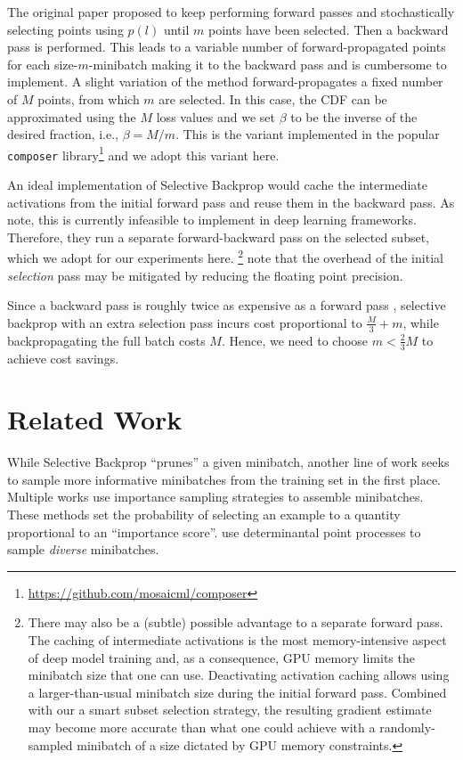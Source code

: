 \documentclass{article}
\theoremstyle{plain}
\theoremstyle{definition}
\theoremstyle{remark}
\begin{document}
The original paper proposed to keep performing forward passes and stochastically selecting points using $p(l)$ until $m$ points have been selected.
Then a backward pass is performed.
This leads to a variable number of forward-propagated points for each size-$m$-minibatch making it to the backward pass and is cumbersome to implement.
A slight variation of the method forward-propagates a fixed number of $M$ points, from which $m$ are selected.
In this case, the CDF can be approximated using the $M$ loss values and we set $\beta$ to be the inverse of the desired fraction, i.e., $\beta = M/m$.
This is the variant implemented in the popular \texttt{composer} library\footnote{\url{https://github.com/mosaicml/composer}} and we adopt this variant here.


An ideal implementation of Selective Backprop would cache the intermediate activations from the initial forward pass and reuse them in the backward pass.
As \citet{jiang2019accelerating} note, this is currently infeasible to implement in deep learning frameworks.
Therefore, they run a separate forward-backward pass on the selected subset, which we adopt for our experiments here.
\footnote{There may also be a (subtle) possible advantage to a separate forward pass.
The caching of intermediate activations is the most memory-intensive aspect of deep model training and, as a consequence, GPU memory limits the minibatch size that one can use.
Deactivating activation caching allows using a larger-than-usual minibatch size during the initial forward pass.
Combined with our a smart subset selection strategy, the resulting gradient estimate may become more accurate than what one could achieve with a randomly-sampled minibatch of a size dictated by GPU memory constraints.
}
\citet{jiang2019accelerating} note that the overhead of the initial \emph{selection} pass may be mitigated by reducing the floating point precision.

Since a backward pass is roughly twice as expensive as a forward pass \citep{jiang2019accelerating}, selective backprop with an extra selection pass incurs cost proportional to $\tfrac{M}{3} + m$, while backpropagating the full batch costs $M$.
Hence, we need to choose $m < \tfrac{2}{3}M$ to achieve cost savings.


\section{Related Work}
\label{sec:related_work}
While Selective Backprop ``prunes'' a given minibatch, another line of work seeks to sample more informative minibatches from the training set in the first place.
Multiple works \citep{alain2015variance,loshchilov2015online,katharopoulos2017biased,csiba2018importance} use importance sampling strategies to assemble minibatches.
These methods set the probability of selecting an example to a quantity proportional to an ``importance score''.
\citet{zhang2017determinantal} use determinantal point processes to sample \emph{diverse} minibatches.
\end{document}
